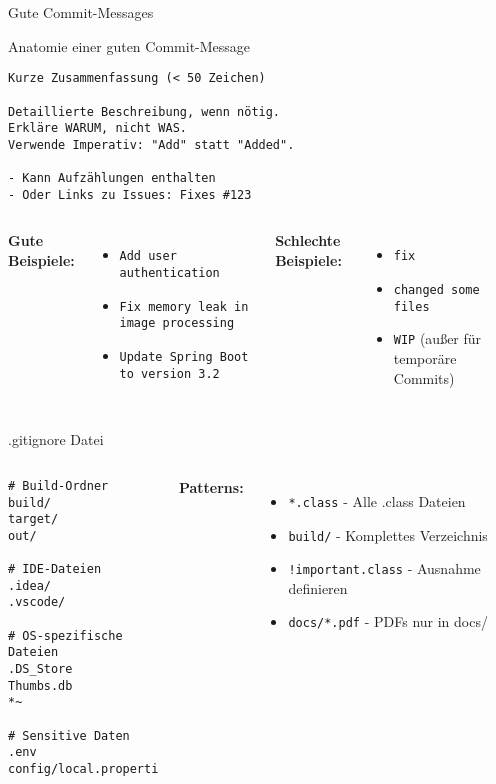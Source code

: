 \begin{frame}[fragile]{Gute Commit-Messages}
  \begin{exampleblock}{Anatomie einer guten Commit-Message}
    \begin{lstlisting}[style=java, basicstyle=\footnotesize\ttfamily, language={}]
Kurze Zusammenfassung (< 50 Zeichen)

Detaillierte Beschreibung, wenn nötig.
Erkläre WARUM, nicht WAS.
Verwende Imperativ: "Add" statt "Added".

- Kann Aufzählungen enthalten
- Oder Links zu Issues: Fixes #123
    \end{lstlisting}
  \end{exampleblock}

  \begin{columns}[T]
    \textbf{Gute Beispiele:}
    {\footnotesize
    \begin{itemize}
      \item \texttt{Add user authentication}
      \item \texttt{Fix memory leak in image processing}
      \item \texttt{Update Spring Boot to version 3.2}
    \end{itemize}
    }

    \textbf{Schlechte Beispiele:}
    {\footnotesize
    \begin{itemize}
      \item \texttt{fix}
      \item \texttt{changed some files}
      \item \texttt{WIP} (außer für temporäre Commits)
    \end{itemize}
    }
  \end{columns}
\end{frame}

\begin{frame}[fragile]{.gitignore Datei}
  \begin{columns}[T]
    \begin{lstlisting}[style=java, basicstyle=\footnotesize\ttfamily, language={}]
# Build-Ordner
build/
target/
out/

# IDE-Dateien
.idea/
.vscode/

# OS-spezifische Dateien
.DS_Store
Thumbs.db
*~

# Sensitive Daten
.env
config/local.properties
    \end{lstlisting}

    \textbf{Patterns:}
    \begin{itemize}
      \item \texttt{*.class} - Alle .class Dateien
      \item \texttt{build/} - Komplettes Verzeichnis
      \item \texttt{!important.class} - Ausnahme definieren
      \item \texttt{docs/*.pdf} - PDFs nur in docs/
    \end{itemize}
  \end{columns}
\end{frame}
